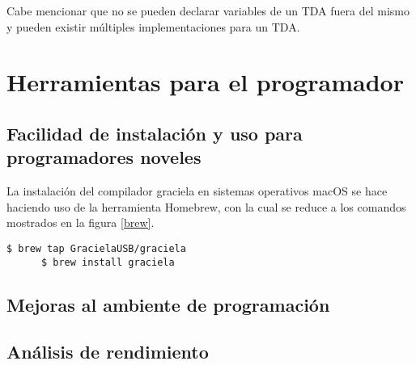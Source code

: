 Cabe mencionar que no se pueden declarar variables de un TDA fuera del mismo y
pueden existir múltiples implementaciones para un TDA.

\section{Herramientas para el programador}
\subsection{Facilidad de instalación y uso para programadores noveles}
\begin{description}[leftmargin=!,labelwidth=\widthof{\bfseries Multiconjunto}]
  \item [APT] 

  \item[Homebrew] La instalación del compilador graciela en sistemas
    operativos macOS se hace haciendo uso de la herramienta Homebrew,
    con la cual se reduce a los comandos mostrados en la figura \ref{brew}.

    \begin{lstlisting}[caption=Homebrew para instalar graciela]
      $ brew tap GracielaUSB/graciela
      $ brew install graciela
    \end{lstlisting}

\end{description}
\subsection{Mejoras al ambiente de programación}
\blindtext[1]

\subsection{Análisis de rendimiento}
\blindtext[1]
